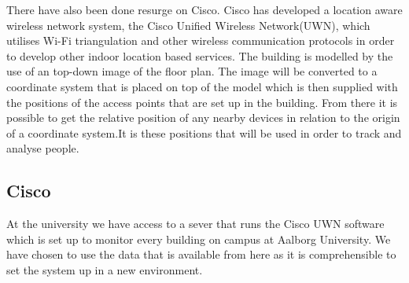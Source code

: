 There have also been done resurge on Cisco. Cisco has developed a location aware wireless network system, the Cisco Unified Wireless Network(UWN), which utilises Wi-Fi triangulation\cite{CiscoTri} and other wireless communication protocols in order to develop other indoor location based services\cite{uwn}. 
The building is modelled by the use of an top-down image of the floor plan. The image will be converted to a coordinate system that is placed on top of the model which is then supplied with the positions of the access points that are set up in the building. From there it is possible to get the relative position of any nearby devices in relation to the origin of a coordinate system.It is these positions that will be used in order to track and analyse people.

\subsection{Cisco}\label{subsec:cisco}
At the university we have access to a sever that runs the Cisco UWN software which is set up to monitor every building on campus at Aalborg University. We have chosen to use the data that is available from here as it is comprehensible to set the system up in a new environment.


